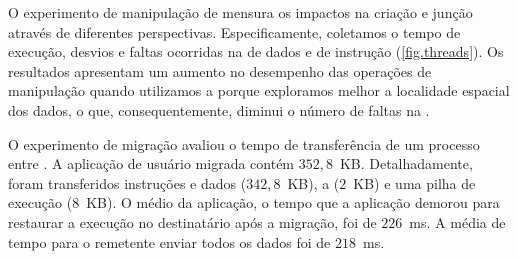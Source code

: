O experimento de manipulação de \threads mensura os impactos na criação e junção através de diferentes perspectivas. Especificamente, coletamos o tempo de execução, desvios e faltas ocorridas na \cache de dados e de instrução (\autoref{fig.threads}).
Os resultados apresentam um aumento no desempenho das operações de manipulação quando utilizamos a \uarea porque exploramos melhor a localidade espacial dos dados, o que, consequentemente, diminui o número de faltas na \cache.

O experimento de migração avaliou o tempo de transferência de um processo entre \clusters.
A aplicação de usuário migrada contém $352,8$~KB. Detalhadamente, foram transferidos instruções e dados ($342,8$~KB), a \uarea ($2$~KB) e uma pilha de execução ($8$~KB). O \downtime médio da aplicação, \ie o tempo que a aplicação demorou para restaurar a execução no \cluster destinatário após a migração, foi de $226$~ms. A média de tempo para o \cluster remetente enviar todos os dados foi de $218$~ms.
